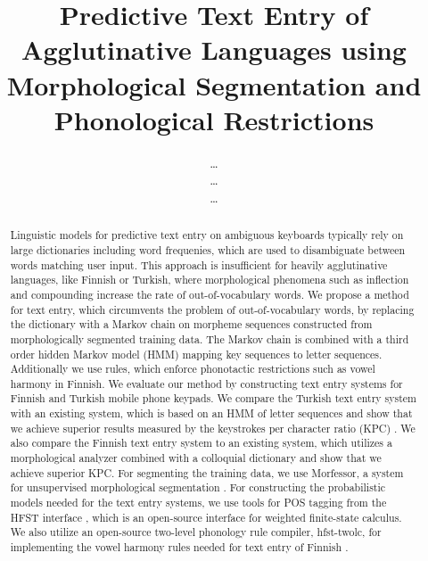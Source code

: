 \documentclass{llncs}
\begin{document}
\title{Predictive Text Entry of Agglutinative Languages using Morphological Segmentation and Phonological Restrictions}

\author{\ldots\\\ldots\\\ldots}
\institute{\ldots}

\maketitle

\begin{abstract}

Linguistic models for predictive text entry on ambiguous keyboards
typically rely on large dictionaries including word frequenies, which
are used to disambiguate between words matching user input. This
approach is insufficient for heavily agglutinative languages, like
Finnish or Turkish, where morphological phenomena such as inflection
and compounding increase the rate of out-of-vocabulary words. We
propose a method for text entry, which circumvents the problem of
out-of-vocabulary words, by replacing the dictionary with a Markov
chain on morpheme sequences constructed from morphologically segmented
training data. The Markov chain is combined with a third order hidden
Markov model (HMM) mapping key sequences to letter
sequences. Additionally we use rules, which enforce phonotactic
restrictions such as vowel harmony in Finnish. We evaluate our method
by constructing text entry systems for Finnish and Turkish mobile
phone keypads. We compare the Turkish text entry system with an
existing system, which is based on an HMM of letter sequences
\cite{Tantug:2010} and show that we achieve superior results measured
by the keystrokes per character ratio (KPC)
\cite{MacKenzie02kspc}. We also compare the Finnish text entry system
to an existing system, which utilizes a morphological analyzer
combined with a colloquial dictionary \cite{silfverberg/2011/cla} and
show that we achieve superior KPC. For segmenting the training data,
we use Morfessor, a system for unsupervised morphological segmentation
\cite{Creutz07ACMTSLP}. For constructing the probabilistic models
needed for the text entry systems, we use tools for POS tagging from
the HFST interface \cite{Silfverberg/2011}, which is an open-source
interface for weighted finite-state calculus. We also utilize an
open-source two-level phonology rule compiler, hfst-twolc, for
implementing the vowel harmony rules needed for text entry of Finnish
\cite{hfst/2011}.

\end{abstract}
\end{document}
